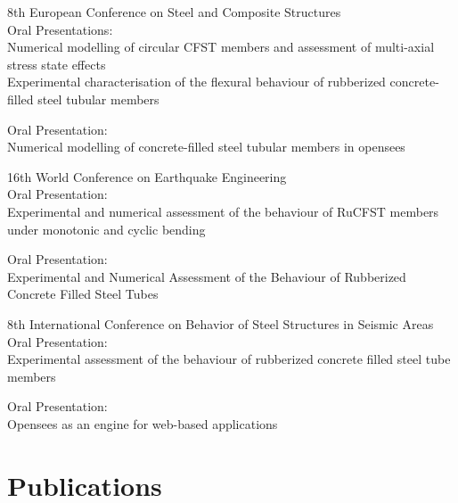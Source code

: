 \documentclass{../Template/myCv}
\begin{document}
 {
  8th European Conference on Steel and Composite Structures \\

  Oral Presentations:\\
  Numerical modelling of circular CFST members and assessment of multi-axial stress state effects\\

  Experimental characterisation of the flexural behaviour of rubberized concrete-filled steel tubular members
}

 {
  Oral Presentation: \\

  Numerical modelling of concrete-filled steel tubular members in opensees
}

 {
  16th World Conference on Earthquake Engineering \\

  Oral Presentation: \\

  Experimental and numerical assessment of the behaviour of RuCFST members under monotonic and cyclic bending
}

 {
  Oral Presentation: \\

  Experimental and Numerical Assessment of the Behaviour of Rubberized Concrete Filled Steel Tubes
}


 {
  8th International Conference on Behavior of Steel Structures in Seismic Areas \\
  
  Oral Presentation: \\

  Experimental assessment of the behaviour of rubberized concrete filled steel tube members
}

 {
  Oral Presentation: \\

  Opensees as an engine for web-based applications
}

\section{Publications}
\end{document}
